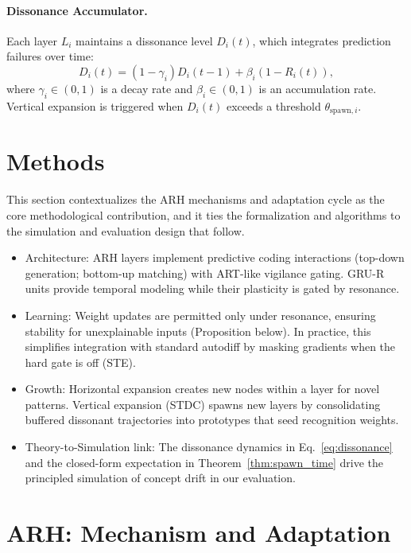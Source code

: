 \documentclass{article}
\numberwithin{figure}{section}
\numberwithin{table}{section}
\numberwithin{algorithm}{section}
\begin{document}
\paragraph{Dissonance Accumulator.} Each layer $L_i$ maintains a dissonance level $D_i(t)$, which integrates prediction failures over time:
\begin{equation}
    D_i(t) = (1 - \gamma_i) D_i(t-1) + \beta_i (1 - R_i(t)),
    \label{eq:dissonance}
\end{equation}
where $\gamma_i \in (0,1)$ is a decay rate and $\beta_i \in (0,1)$ is an accumulation rate. Vertical expansion is triggered when $D_i(t)$ exceeds a threshold $\theta_{\text{spawn},i}$.

\section{Methods}
This section contextualizes the ARH mechanisms and adaptation cycle as the core methodological contribution, and it ties the formalization and algorithms to the simulation and evaluation design that follow.
\begin{itemize}
    \item Architecture: ARH layers implement predictive coding interactions (top-down generation; bottom-up matching) with ART-like vigilance gating. GRU-R units provide temporal modeling while their plasticity is gated by resonance.
    \item Learning: Weight updates are permitted only under resonance, ensuring stability for unexplainable inputs (Proposition below). In practice, this simplifies integration with standard autodiff by masking gradients when the hard gate is off (STE).
    \item Growth: Horizontal expansion creates new nodes within a layer for novel patterns. Vertical expansion (STDC) spawns new layers by consolidating buffered dissonant trajectories into prototypes that seed recognition weights.
    \item Theory-to-Simulation link: The dissonance dynamics in Eq.~\eqref{eq:dissonance} and the closed-form expectation in Theorem~\ref{thm:spawn_time} drive the principled simulation of concept drift in our evaluation.
\end{itemize}

\section{ARH: Mechanism and Adaptation}
\end{document}
